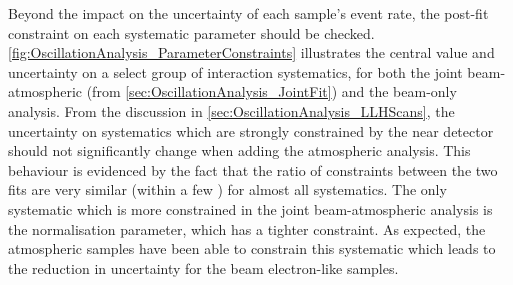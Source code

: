 Beyond the impact on the uncertainty of each sample's event rate, the post-fit constraint on each systematic parameter should be checked. \autoref{fig:OscillationAnalysis_ParameterConstraints} illustrates the central value and uncertainty on a select group of interaction systematics, for both the joint beam-atmospheric (from \autoref{sec:OscillationAnalysis_JointFit}) and the beam-only analysis. From the discussion in \autoref{sec:OscillationAnalysis_LLHScans}, the uncertainty on systematics which are strongly constrained by the near detector should not significantly change when adding the atmospheric analysis. This behaviour is evidenced by the fact that the ratio of constraints between the two fits are very similar (within a few \quickmath{\%}) for almost all systematics. The only systematic which is more constrained in the joint beam-atmospheric analysis is the  normalisation parameter, which has a  tighter constraint. As expected, the atmospheric samples have been able to constrain this systematic which leads to the reduction in uncertainty for the beam electron-like samples.

